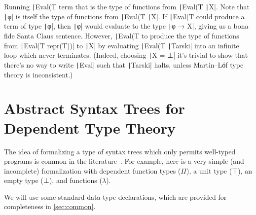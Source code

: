   Running \texttt|Eval(T %
  term that is the type of functions from
  \texttt|Eval(T %
  \texttt|X|. Note that \texttt|φ| is itself
  the type of functions from \texttt|Eval(T %
  \texttt|X|.  If \texttt|Eval(T %
  could produce a term of type \texttt|φ|, then
  \texttt|φ| would evaluate to the type
  \texttt|φ → X|, giving us a bona fide Santa Claus
  sentence. However, \texttt|Eval(T %
  to produce the type of functions from \texttt|Eval(T %
  repr(T))| to \texttt|X| by evaluating
  \texttt|Eval(T %
  \texttt|Tarski| into an infinite loop which never
  terminates. (Indeed, choosing \texttt|X = ⊥| it's
  trivial to show that there's no way to write
  \texttt|Eval| such that \texttt|Tarski|
  halts, unless Martin--Lӧf type theory is inconsistent.)

\section{Abstract Syntax Trees for Dependent Type Theory} \label{sec:local-interpretation}

  The idea of formalizing a type of syntax trees which only permits
  well-typed programs is common in the
  literature~\cite{mcbride2010outrageous,Chapman200921,danielsson2006formalisation}.
  For example, here is a very simple (and incomplete) formalization
  with dependent function types ($\Pi$), a unit type (⊤), an empty
  type (⊥), and functions ($\lambda$).

  We will use some standard data type declarations, which are provided
  for completeness in \autoref{sec:common}.

